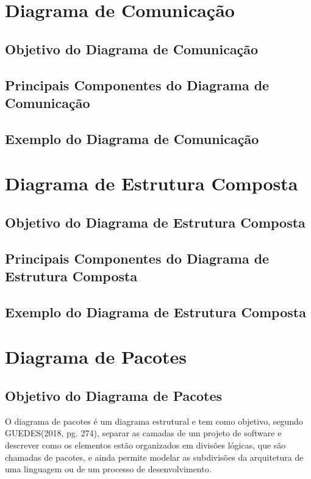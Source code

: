 \documentclass[12pt,openright,oneside,a4paper,
	chapter=TITLE,
	section=TITLE,
	english,brazil]{abntex2}
\begin{document}
\chapter{Diagrama de Comunicação}

\section{Objetivo do Diagrama de Comunicação}

\section{Principais Componentes do Diagrama de Comunicação}

\section{Exemplo do Diagrama de Comunicação}

\chapter{Diagrama de Estrutura Composta}

\section{Objetivo do Diagrama de Estrutura Composta}

\section{Principais Componentes do Diagrama de Estrutura Composta}

\section{Exemplo do Diagrama de Estrutura Composta}

\chapter{Diagrama de Pacotes}

\section{Objetivo do Diagrama de Pacotes}

O diagrama de pacotes é um diagrama estrutural e tem como objetivo, segundo GUEDES(2018, pg. 274), separar as camadas de um projeto de software e descrever como os elementos estão organizados em divisões lógicas, que são chamadas de pacotes, e ainda permite modelar as subdivisões da arquitetura de uma linguagem ou de um processo de desenvolvimento.
\end{document}

